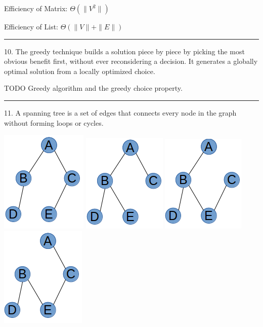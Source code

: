 \documentclass{article}
\begin{document}
Efficiency of Matrix: $\Theta(\|V^2\|)$

Efficiency of List: $\Theta(\|V\|+  \|E\|)$

\noindent\rule{8cm}{0.4pt}


10. The greedy technique builds a solution piece by piece by picking the most obvious benefit first, without ever reconsidering a decision. It generates a globally optimal solution from a locally optimized choice. 

TODO Greedy algorithm and the greedy choice property. 


\noindent\rule{8cm}{0.4pt}

11. A spanning tree is a set of edges that connects every node in the graph without forming loops or cycles. 


\includegraphics[scale=0.5]{./P11/1}
\includegraphics[scale=0.5]{./P11/2}
\includegraphics[scale=0.5]{./P11/3}
\includegraphics[scale=0.5]{./P11/4}
\end{document}

